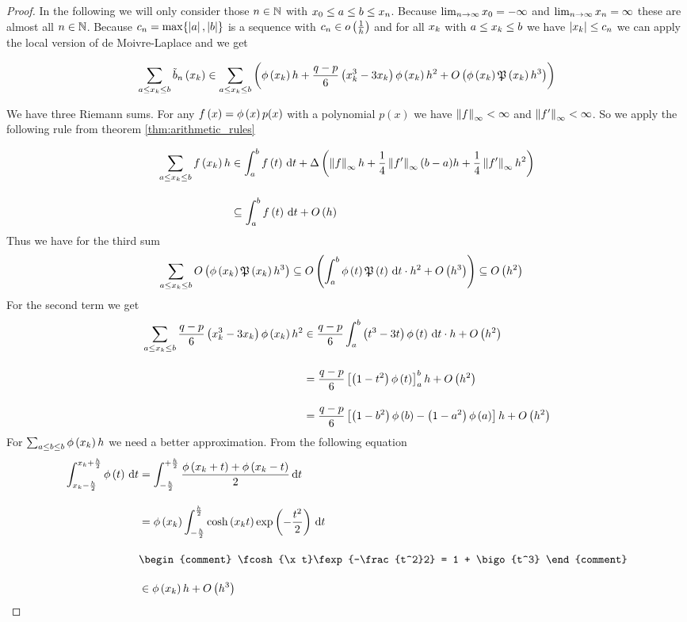\begin{proof}
  In the following we will only consider those $n\in\N$ with $\x[0] \le a \le b \le \x[n]$. Because $\lim_{n\to\infty} \x[0] = -\infty$ and $\lim_{n\to\infty} \x[n] = \infty$ these are almost all $n\in\N$. Because $c_n=\max\{\abs{a},\abs{b}\}$ is a sequence with $c_n\in\littleo{\frac 1h}$ and for all $\x$ with $a \le \x \le b$ we have $\abs{\x} \le c_n$ we can apply the local version of de Moivre-Laplace and we get

  \begin{align}
    \sum_{a \le \x \le b} \bb{\x} \in \sum_{a \le \x \le b} \br{\fphi{\x} h +\frac{q-p}6 \left(\x^3 - 3\x\right) \fphi{\x} h^2 + \bigo{\fphi{\x}\pol{\x}h^3}}
  \end{align}

  We have three Riemann sums. For any $\f{x}=\fphi{x}p(x)$ with a polynomial $p(x)$ we have $\snorm{f} < \infty$ and $\snorm{f'}<\infty$. So we apply the following rule from theorem \ref{thm:arithmetic_rules}

  \begin{align}
    \sum_{a \le \x \le b} \f{\x} h & \in \int_a^b \f{t} \d{t} + \bigabs{\snorm{f}h + \frac 14 \snorm{f'} (b-a) h + \frac 14 \snorm{f'} h^2} \bnl
    & \subseteq  \int_a^b \f{t} \d{t} + \bigo{h}
  \end{align}
  Thus we have for the third sum
  \begin{align}
    \sum_{a \le \x \le b} \bigo{\fphi{\x} \pol{\x} h^3} & \subseteq \bigo{\int_a^b \fphi{t} \pol{t} \d{t} \cdot h^2 + \bigo{h^3}} \subseteq \bigo{h^2}
  \end{align}
  For the second term we get
  \begin{align}
    \sum_{a \le \x \le b} \frac{q-p}6 \br{\x^3 - 3\x} \fphi{\x} h^2 &\in \frac{q-p}6 \int_a^b \br{t^3-3t}\fphi{t} \d{t} \cdot h + \bigo{h^2} \bnl
    &= \frac{q-p}6 \left[ \br{1-t^2}\fphi{t} \right]_a^b h + \bigo{h^2} \bnl
    &= \frac{q-p}6 \left[ \br{1-b^2}\fphi{b} - \br{1-a^2}\fphi{a} \right] h + \bigo{h^2}
  \end{align}
  For $\sum_{a\le b\le b} \fphi{\x}h$ we need a better approximation. From the following equation
  \begin{align}
    \int_{\x-\frac h2}^{\x+\frac h2} \fphi{t} \d{t} & = \int_{-\frac h2}^{+\frac h2} \frac{\fphi{\x+t}+\fphi{\x-t}}2 \d{t} \bnl
    & = \fphi{\x} \int_{-\frac h2}^{\frac h2} \fcosh{\x t} \fexp{-\frac{t^2}2} \d{t} \bnl
    &
    \begin{comment}
      \fcosh{\x t}\fexp{-\frac{t^2}2} = 1 + \bigo{t^3}
    \end{comment} \bnl
    & \in \fphi{\x} h + \bigo{h^3}
  \end{align}


\end{proof}

